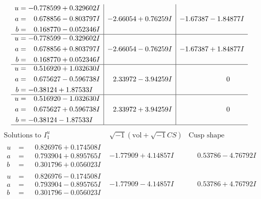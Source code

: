 \documentclass[1p]{elsarticle_modified}
\theoremstyle{definition}
\newcommand{\I}{\sqrt{-1}}
\begin{document}
$$\begin{array}{c|c|c}
\begin{aligned}
u &= -0.778599 + 0.329602 I \\
a &= \phantom{-}0.678856 - 0.803797 I \\
b &= \phantom{-}0.168770 - 0.052346 I\end{aligned}
 & -2.66054 + 0.76259 I & -1.67387 - 1.84877 I \\ \hline\begin{aligned}
u &= -0.778599 - 0.329602 I \\
a &= \phantom{-}0.678856 + 0.803797 I \\
b &= \phantom{-}0.168770 + 0.052346 I\end{aligned}
 & -2.66054 - 0.76259 I & -1.67387 + 1.84877 I \\ \hline\begin{aligned}
u &= \phantom{-}0.516920 + 1.032630 I \\
a &= \phantom{-}0.675627 - 0.596738 I \\
b &= -0.38124 + 1.87533 I\end{aligned}
 & \phantom{-}2.33972 - 3.94259 I & \phantom{-0.000000 } 0 \\ \hline\begin{aligned}
u &= \phantom{-}0.516920 - 1.032630 I \\
a &= \phantom{-}0.675627 + 0.596738 I \\
b &= -0.38124 - 1.87533 I\end{aligned}
 & \phantom{-}2.33972 + 3.94259 I & \phantom{-0.000000 } 0\\
 \hline 
 \end{array}$$\newpage$$\begin{array}{c|c|c}  
\text{Solutions to }I^u_{1}& \I (\text{vol} + \sqrt{-1}CS) & \text{Cusp shape}\\
 \hline 
\begin{aligned}
u &= \phantom{-}0.826976 + 0.174508 I \\
a &= \phantom{-}0.793904 + 0.895765 I \\
b &= \phantom{-}0.301796 + 0.056023 I\end{aligned}
 & -1.77909 + 4.14857 I & \phantom{-}0.53786 - 4.76792 I \\ \hline\begin{aligned}
u &= \phantom{-}0.826976 - 0.174508 I \\
a &= \phantom{-}0.793904 - 0.895765 I \\
b &= \phantom{-}0.301796 - 0.056023 I\end{aligned}
 & -1.77909 - 4.14857 I & \phantom{-}0.53786 + 4.76792 I \\ \hline\begin{aligned}

\end{aligned}
\end{array}$$
\end{document}
